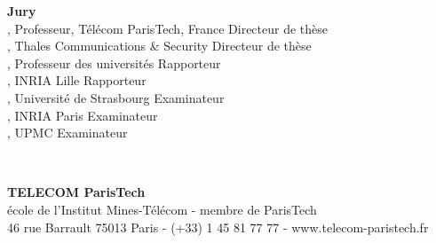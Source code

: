 \vfill

\begin{minipage}{.9\textwidth}	%
  \textbf{Jury}\\

\textbf{\JeanLouis}, {\small Professeur, Télécom ParisTech, France}
	\hfill Directeur de thèse\\
\textbf{\Vania}, {\small Thales Communications \& Security}
	\hfill Directeur de thèse\\

\textbf{\Duda}, {\small Professeur des universités}
	\hfill Rapporteur\\
\textbf{\Nathalie}, {\small INRIA Lille}
	\hfill Rapporteur\\
\textbf{\Fabrice}, {\small Université de Strasbourg}
	\hfill Examinateur\\
\textbf{\Thomas}, {\small INRIA Paris}
	\hfill Examinateur\\
\textbf{\Marcelo}, {\small UPMC}
	\hfill Examinateur


\end{minipage}\\

\vspace{-.3cm}

\begin{center}
	
\textbf{TELECOM ParisTech}\\
{\small école de l'Institut Mines-Télécom - membre de ParisTech}\\
{\tiny 46 rue Barrault 75013 Paris - (+33) 1 45 81 77 77 - www.telecom-paristech.fr}
\end{center}


\restoregeometry
